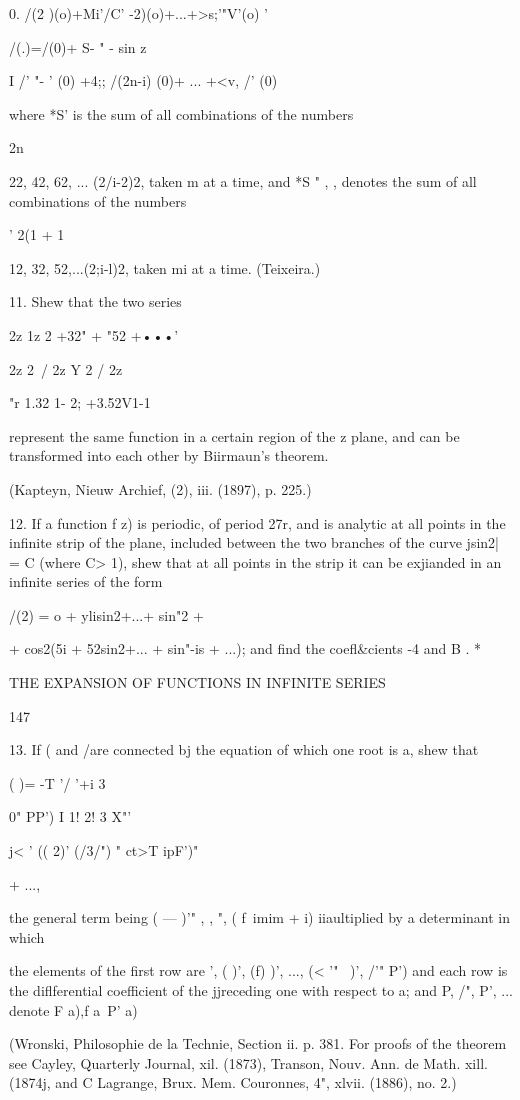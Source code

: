 {{0. /(2 )(o)+Mi'/C' -2)(o)+...+>s;'"V'(o) '

/(.)=/(0)+ S- " - sin z

I /' "- ' (0) +4;; /(2n-i) (0)+ ... +<v, /' (0)

where *S' is the sum of all combinations of the numbers

2n

22, 42, 62, ... (2/i-2)2, taken m at a time, and *S " , , denotes the
sum of all combinations of the numbers

' 2(1 + 1

12, 32, 52,...(2;i-l)2, taken mi at a time. (Teixeira.)

11. Shew that the two series

2z 1z 2 +32" + "52 +•••'

2z 2\ / 2z Y 2 / 2z

 "r 1.32 1- 2; +3.52V1-1

represent the same function in a certain region of the z plane, and
can be transformed into each other by Biirmaun's theorem.

(Kapteyn, Nieuw Archief, (2), iii. (1897), p. 225.)

12. If a function f z) is periodic, of period 27r, and is analytic at
all points in the infinite strip of the plane, included between the
two branches of the curve jsin2| = C (where C> 1), shew that at all
points in the strip it can be exjianded in an infinite series of the
form

/(2) = o + ylisin2+...+ sin"2 +

+ cos2(5i + 52sin2+... + sin"-is + ...); and find the coefl\&cients
-4 and B . *

THE EXPANSION OF FUNCTIONS IN INFINITE SERIES

147

13. If ( and /are connected bj the equation of which one root is a,
shew that

 ( )= -T '/ '+i 3

0" PP') I 1! 2! 3 X"'

j< ' (( 2)' (/3/") " ct>T ipF')"

+ ...,

the general term being ( — )'" , , ", ( f\ imim + i) iiaultiplied by a
determinant in which

the elements of the first row are ', ( )', (f) )', ..., (< '"~ )', /'"
P') and each row is the diflferential coefficient of the jjreceding
one with respect to a; and P, /", P', ... denote F a),f a\ P' a)

(Wronski, Philosophie de la Technie, Section ii. p. 381. For proofs of
the theorem see Cayley, Quarterly Journal, xil. (1873), Transon, Nouv.
Ann. de Math. xill. (1874j, and C Lagrange, Brux. Mem. Couronnes, 4",
xlvii. (1886), no. 2.)

}}
